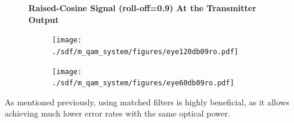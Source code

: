 \begin{figure}[H]
	\centering
	\textbf{Raised-Cosine Signal (roll-off=0.9) At the Transmitter Output}
	\begin{subfigure}{.5\textwidth}
		\centering
		\texttt{[image: ./sdf/m\_qam\_system/figures/eye120db09ro.pdf]}
	\end{subfigure}%
	\begin{subfigure}{.5\textwidth}
		\centering
		\texttt{[image: ./sdf/m\_qam\_system/figures/eye60db09ro.pdf]}
	\end{subfigure}
	\caption{\label{fig:eyespower}}
\end{figure}

As mentioned previously, using matched filters is highly beneficial, as it
allows achieving much lower error rates with the same optical power.

